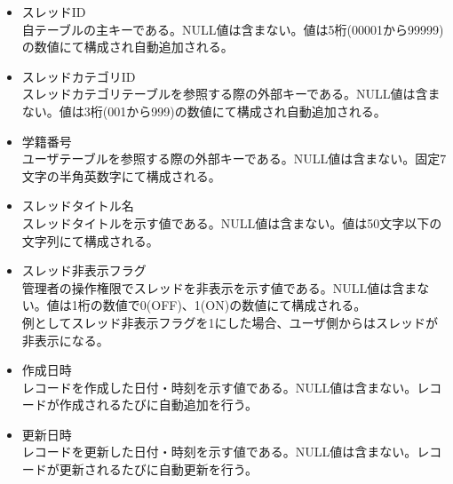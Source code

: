 \documentclass[a4j]{jarticle}
\begin{document}
  \begin{itemize}
  \item スレッドID\\
    自テーブルの主キーである。NULL値は含まない。値は5桁(00001から99999)の数値にて構成され自動追加される。\\

  \item スレッドカテゴリID\\
    スレッドカテゴリテーブルを参照する際の外部キーである。NULL値は含まない。値は3桁(001から999)の数値にて構成され自動追加される。\\

  \item 学籍番号\\
    ユーザテーブルを参照する際の外部キーである。NULL値は含まない。固定7文字の半角英数字にて構成される。\\

  \item スレッドタイトル名\\
    スレッドタイトルを示す値である。NULL値は含まない。値は50文字以下の文字列にて構成される。\\
  \item スレッド非表示フラグ\\
    管理者の操作権限でスレッドを非表示を示す値である。NULL値は含まない。値は1桁の数値で0(OFF)、1(ON)の数値にて構成される。\\
    例としてスレッド非表示フラグを1にした場合、ユーザ側からはスレッドが非表示になる。
  \item 作成日時\\
    レコードを作成した日付・時刻を示す値である。NULL値は含まない。レコードが作成されるたびに自動追加を行う。
  \item 更新日時\\
    レコードを更新した日付・時刻を示す値である。NULL値は含まない。レコードが更新されるたびに自動更新を行う。
  \end{itemize}
\end{document}
